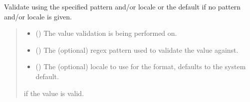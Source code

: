 \documentclass[letterpaper,10pt,english]{sphinxmanual}
\begin{document}
\begin{fulllineitems}
\begin{fulllineitems}
\label{\detokenize{apache_commons_validator_python.routines:apache_commons_validator_python.routines.abstract_format_validator.AbstractFormatValidator.is_valid}}
\pysigstartsignatures
{}
\pysigstopsignatures
\sphinxAtStartPar
Validate using the specified pattern and/or locale or the default if no
pattern and/or locale is given.
\begin{quote}\begin{description}
\begin{itemize}
\item {} 
\sphinxAtStartPar
{} () \textendash{} The value validation is being performed on.

\item {} 
\sphinxAtStartPar
{} () \textendash{} The (optional) regex pattern used to validate the value against.

\item {} 
\sphinxAtStartPar
{} () \textendash{} The (optional) locale to use for the format,
defaults to the system default.

\end{itemize}

\sphinxAtStartPar
{} if the value is valid.

\end{description}\end{quote}

\end{fulllineitems}



\end{fulllineitems}
\end{document}
